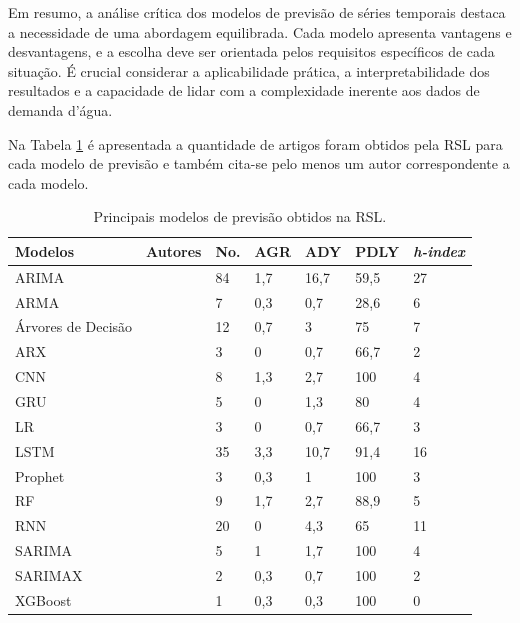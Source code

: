 Em resumo, a análise crítica dos modelos de previsão de séries temporais destaca a necessidade de uma abordagem equilibrada. Cada modelo apresenta vantagens e desvantagens, e a escolha deve ser orientada pelos requisitos específicos de cada situação. É crucial considerar a aplicabilidade prática, a interpretabilidade dos resultados e a capacidade de lidar com a complexidade inerente aos dados de demanda d'água.

Na Tabela \ref{tb:mode} é apresentada a quantidade de artigos foram obtidos pela RSL para cada modelo de previsão e também cita-se pelo menos um autor correspondente a cada modelo.

\begin{table}[!htb]
	\centering
	\caption{Principais modelos de previsão obtidos na RSL.}\label{tb:mode}
	\small %
	\begin{tabular}{lllllll}
		\toprule
		Modelos & Autores & No. & AGR & ADY & PDLY & \textit{h-index} \\
		\midrule
		ARIMA & \citeonline{2-s2.0-85069459067} & 84 & 1,7 & 16,7 & 59,5 & 27 \\
		ARMA & \citeonline{2-s2.0-85038637324} & 7 & 0,3 & 0,7 & 28,6 & 6 \\
		Árvores de Decisão & \citeonline{2-s2.0-85054695177} & 12 & 0,7 & 3 & 75 & 7 \\
		ARX & \citeonline{2-s2.0-85051469381} & 3 & 0 & 0,7 & 66,7 & 2 \\	
		CNN & \citeonline{WOS:000841076700002} & 8 & 1,3 & 2,7 & 100 & 4 \\
		GRU & \citeonline{2-s2.0-85135210428} & 5 & 0 & 1,3 & 80 & 4 \\
		LR & \citeonline{2-s2.0-85125426780} & 3 & 0 & 0,7 & 66,7 & 3 \\
		LSTM & \citeonline{WOS:000529902300014} & 35 & 3,3 & 10,7 & 91,4 & 16 \\
		Prophet & \citeonline{2-s2.0-85092514286} & 3 & 0,3 & 1 & 100 & 3 \\
		RF & \citeonline{2-s2.0-85135210428} & 9 & 1,7 & 2,7 & 88,9 & 5 \\
		RNN & \citeonline{2-s2.0-85067419084} & 20 & 0 & 4,3 & 65 & 11 \\
		SARIMA & \citeonline{2-s2.0-85128561644} & 5 & 1 & 1,7 & 100 & 4 \\
		SARIMAX & \citeonline{2-s2.0-85099424908} & 2 & 0,3 & 0,7 & 100 & 2 \\	
		XGBoost & \citeonline{2-s2.0-85130441623} & 1 & 0,3 & 0,3 & 100 & 0 \\
		\bottomrule
	\end{tabular}
\end{table}

